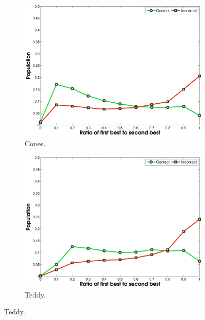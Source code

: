 \documentclass[letterpaper,12pt]{article}
\begin{document}
\begin{figure}[!h]
        \centering
        \begin{subfigure}[b]{0.48\textwidth}
                \includegraphics[width=\textwidth]{rat_w_cones.pdf}
                 \caption{Cones.}
        \end{subfigure}%
        \begin{subfigure}[b]{0.48\textwidth}
                \includegraphics[width=\textwidth]{rat_w_teddy.pdf}
                \caption{Teddy.}

\end{subfigure}
\end{figure}
\end{document}

